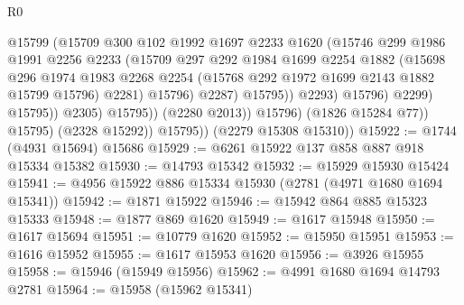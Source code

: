 \begin{lexlean}{R0}
\begin{coremodule}
                                      @15799
                                      (@15709
                                        @300
                                        @102
                                        @1992
                                        @1697
                                        @2233
                                        @1620
                                        (@15746
                                          @299
                                          @1986
                                          @1991
                                          @2256
                                          @2233
                                          (@15709
                                            @297
                                            @292
                                            @1984
                                            @1699
                                            @2254
                                            @1882
                                            (@15698
                                              @296
                                              @1974
                                              @1983
                                              @2268
                                              @2254
                                              (@15768 @292 @1972 @1699 @2143 @1882 @15799 @15796)
                                              @2281)
                                            @15796)
                                          @2287)
                                        @15795))
                                    @2293)
                                  @15796)
                                @2299)
                              @15795))
                          @2305)
                        @15795))
                    (@2280 @2013))
                  @15796)
                (@1826 @15284 @77))
              @15795)
            (@2328 @15292))
          @15795))
      (@2279 @15308 @15310))
@15922 := @1744 (@4931 @15694) @15686
@15929 := @6261 @15922 @137 @858 @887 @918 @15334 @15382
@15930 := @14793 @15342
@15932 := @15929 @15930 @15424
@15941 := @4956 @15922 @886 @15334 @15930 (@2781 (@4971 @1680 @1694 @15341))
@15942 := @1871 @15922
@15946 := @15942 @864 @885 @15323 @15333
@15948 := @1877 @869 @1620
@15949 := @1617 @15948
@15950 := @1617 @15694
@15951 := @10779 @1620
@15952 := @15950 @15951
@15953 := @1616 @15952
@15955 := @1617 @15953 @1620
@15956 := @3926 @15955
@15958 := @15946 (@15949 @15956)
@15962 := @4991 @1680 @1694 @14793 @2781
@15964 := @15958 (@15962 @15341)

\end{coremodule}
\end{lexlean}
